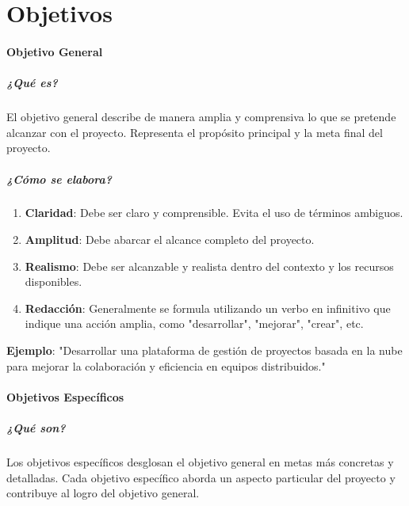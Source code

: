 \chapter{Objetivos}
\label{Objetivos}

\subsubsection{Objetivo General}

\paragraph{¿Qué es?}

El objetivo general describe de manera amplia y comprensiva lo que se pretende alcanzar con el proyecto. Representa el propósito principal y la meta final del proyecto.

\paragraph{¿Cómo se elabora?}

\begin{enumerate}
    \item \textbf{Claridad}: Debe ser claro y comprensible. Evita el uso de términos ambiguos.
    \item \textbf{Amplitud}: Debe abarcar el alcance completo del proyecto.
    \item \textbf{Realismo}: Debe ser alcanzable y realista dentro del contexto y los recursos disponibles.
    \item \textbf{Redacción}: Generalmente se formula utilizando un verbo en infinitivo que indique una acción amplia, como "desarrollar", "mejorar", "crear", etc.
\end{enumerate}
\textbf{Ejemplo}: "Desarrollar una plataforma de gestión de proyectos basada en la nube para mejorar la colaboración y eficiencia en equipos distribuidos."

\subsubsection{Objetivos Específicos}

\paragraph{¿Qué son?}

Los objetivos específicos desglosan el objetivo general en metas más concretas y detalladas. Cada objetivo específico aborda un aspecto particular del proyecto y contribuye al logro del objetivo general.

